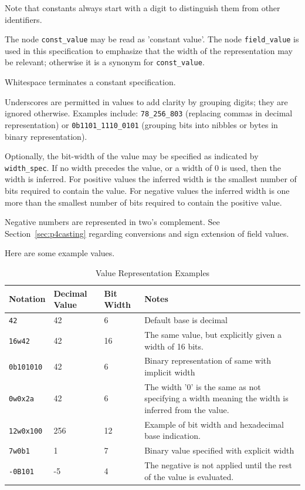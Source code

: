 \documentclass[12pt]{article}
\begin{document}
Note that constants always start with a digit to distinguish them from other 
identifiers.

The node \texttt{const_value} may be read as 'constant value'. The node
\texttt{field_value} is used in this specification to emphasize that the width
of the representation may be relevant; otherwise it is a synonym for
\texttt{const_value}.

Whitespace terminates a constant specification.

Underscores are permitted in values to add clarity by grouping digits; they are
ignored otherwise. Examples include: \texttt{78_256_803} (replacing commas in
decimal representation) or \texttt{0b1101_1110_0101} (grouping bits into nibbles
or bytes in binary representation).

Optionally, the bit-width of the value may be specified as indicated by
\texttt{width_spec}. If no width precedes the value, or a width of 0 is used,
then the width is inferred. For positive values the inferred width is the
smallest number of bits required to contain the value. For negative values the
inferred width is one more than the smallest number of bits required to contain
the positive value.

Negative numbers are represented in two's complement. See 
Section~\ref{sec:p4casting} regarding conversions and sign extension of field 
values.

Here are some example values.

\begin{table}[H]
\begin{center}
\begin{tabular}{| l | l | l | p{} |} \hline
\textbf{Notation} &
\textbf{Decimal Value} & 
\textbf{Bit Width} &
\textbf{Notes} \\ \hline
\texttt{42} &
42 &
6 &
Default base is decimal \\ \hline
\texttt{16w42} &
42 &
16 &
The same value, but explicitly given a width of 16 bits. \\ \hline
\texttt{0b101010} &
42 &
6 &
Binary representation of same with implicit width \\ \hline
\texttt{0w0x2a} &
42 &
6 &
The width '0' is the same as not specifying a width meaning the width is inferred from the value.   \\ \hline
\texttt{12w0x100} &
256 &
12 &
Example of bit width and hexadecimal base indication. \\ \hline
\texttt{7w0b1} &
1 &
7 &
Binary value specified with explicit width \\ \hline
\texttt{-0B101} &
-5 &
4 &
The negative is not applied until the rest of the value is evaluated. \\ \hline
\end{tabular}
\end{center}
\caption{Value Representation Examples}
\end{table}
\end{document}
